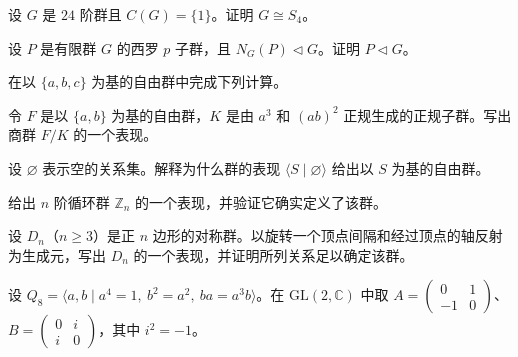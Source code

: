 \newpage
\noindent\begin{minipage}{\textwidth}
设 $G$ 是 $24$ 阶群且 $C(G)=\{1\}$。证明 $G\cong S_4$。
\end{minipage}\par\vfill
\noindent\begin{minipage}{\textwidth}
设 $P$ 是有限群 $G$ 的西罗 $p$ 子群，且 $N_G(P)\triangleleft G$。证明 $P\triangleleft G$。
\end{minipage}\par\vfill
\noindent\begin{minipage}{\textwidth}
在以 $\{a,b,c\}$ 为基的自由群中完成下列计算。
\end{minipage}\par\vfill
\newpage
\noindent\begin{minipage}{\textwidth}
令 $F$ 是以 $\{a,b\}$ 为基的自由群，$K$ 是由 $a^3$ 和 $(ab)^2$ 正规生成的正规子群。写出商群 $F/K$ 的一个表现。
\end{minipage}\par\vfill
\noindent\begin{minipage}{\textwidth}
设 $\varnothing$ 表示空的关系集。解释为什么群的表现 $\langle S\mid\varnothing\rangle$ 给出以 $S$ 为基的自由群。
\end{minipage}\par\vfill
\noindent\begin{minipage}{\textwidth}
给出 $n$ 阶循环群 $\mathbb Z_n$ 的一个表现，并验证它确实定义了该群。
\end{minipage}\par\vfill
\newpage
\noindent\begin{minipage}{\textwidth}
设 $D_n$（$n\ge3$）是正 $n$ 边形的对称群。以旋转一个顶点间隔和经过顶点的轴反射为生成元，写出 $D_n$ 的一个表现，并证明所列关系足以确定该群。
\end{minipage}\par\vfill
\noindent\begin{minipage}{\textwidth}
设 $Q_8=\langle a,b\mid a^4=1,\ b^2=a^2,\ ba=a^3b\rangle$。在 $\mathrm{GL}(2,\mathbb C)$ 中取 $A=\begin{pmatrix}0&1\\-1&0\end{pmatrix}$、$B=\begin{pmatrix}0&i\\i&0\end{pmatrix}$，其中 $i^2=-1$。
\end{minipage}\par\vfill
